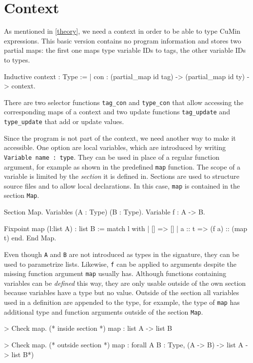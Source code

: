 \documentclass[paper = a4, fleqn, abstract=on, twoside]{scrreprt}
\newcommand{\coqinline}[1]{\texttt{#1}}
\begin{document}
\section{Context}
As mentioned in \autoref{theory}, we need a context in order to be able to type CuMin expressions. This basic version contains no program information and stores two partial maps: the first one maps type variable IDs to tags, the other variable IDs to types. 
\begin{coqcode}
Inductive context : Type := 
  | con : (partial_map id tag) -> (partial_map id ty) -> context.
\end{coqcode}
There are two selector functions \texttt{tag\_con} and \texttt{type\_con} that allow accessing the corresponding maps of a context and two update functions \coqinline{tag_update} and \coqinline{type_update} that add or update values.
\par
Since the program is not part of the context, we need another way to make it accessible. One option are local variables, which are introduced by writing \coqinline{Variable name : type}. They can be used in place of a regular function argument, for example as shown in the predefined \coqinline{map} function. The scope of a variable is limited by the \textit{section} it is defined in. Sections are used to structure source files and to allow local declarations. In this case, \texttt{map} is contained in the section \texttt{Map}.
\begin{coqcode}
Section Map.
  Variables (A : Type) (B : Type).
  Variable f : A -> B.
  
  Fixpoint map (l:list A) : list B :=
    match l with
    | [] => []
    | a :: t => (f a) :: (map t)
    end.
End Map.
\end{coqcode}
Even though \coqinline{A} and \coqinline{B} are not introduced as types in the signature, they can be used to parametrize lists. Likewise, \coqinline{f} can be applied to arguments despite the missing function argument \coqinline{map} usually has. Although functions containing variables can be \textit{defined} this way, they are only usable outside of the own section because variables have a type but no value. Outside of the section all variables used in a definition are appended to the type, for example, the type of \texttt{map} has additional type and function arguments outside of the section \texttt{Map}.
\begin{coqcode}
> Check map. (* inside section *)
map : list A -> list B

> Check map. (* outside section *)
map : forall A B : Type, (A -> B) -> list A -> list B*)
\end{coqcode}
\end{document}
